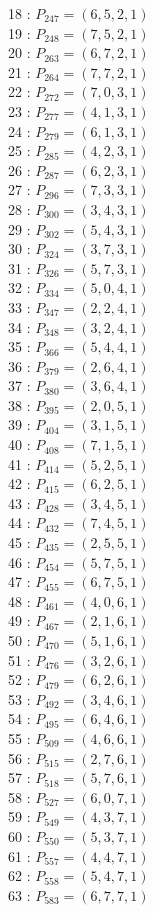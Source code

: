 \documentclass{article}
\begin{document}
{\begin{multicols}{2}
18 : $P_{247}=( 6, 5, 2, 1 )$\\
19 : $P_{248}=( 7, 5, 2, 1 )$\\
20 : $P_{263}=( 6, 7, 2, 1 )$\\
21 : $P_{264}=( 7, 7, 2, 1 )$\\
22 : $P_{272}=( 7, 0, 3, 1 )$\\
23 : $P_{277}=( 4, 1, 3, 1 )$\\
24 : $P_{279}=( 6, 1, 3, 1 )$\\
25 : $P_{285}=( 4, 2, 3, 1 )$\\
26 : $P_{287}=( 6, 2, 3, 1 )$\\
27 : $P_{296}=( 7, 3, 3, 1 )$\\
28 : $P_{300}=( 3, 4, 3, 1 )$\\
29 : $P_{302}=( 5, 4, 3, 1 )$\\
30 : $P_{324}=( 3, 7, 3, 1 )$\\
31 : $P_{326}=( 5, 7, 3, 1 )$\\
32 : $P_{334}=( 5, 0, 4, 1 )$\\
33 : $P_{347}=( 2, 2, 4, 1 )$\\
34 : $P_{348}=( 3, 2, 4, 1 )$\\
35 : $P_{366}=( 5, 4, 4, 1 )$\\
36 : $P_{379}=( 2, 6, 4, 1 )$\\
37 : $P_{380}=( 3, 6, 4, 1 )$\\
38 : $P_{395}=( 2, 0, 5, 1 )$\\
39 : $P_{404}=( 3, 1, 5, 1 )$\\
40 : $P_{408}=( 7, 1, 5, 1 )$\\
41 : $P_{414}=( 5, 2, 5, 1 )$\\
42 : $P_{415}=( 6, 2, 5, 1 )$\\
43 : $P_{428}=( 3, 4, 5, 1 )$\\
44 : $P_{432}=( 7, 4, 5, 1 )$\\
45 : $P_{435}=( 2, 5, 5, 1 )$\\
46 : $P_{454}=( 5, 7, 5, 1 )$\\
47 : $P_{455}=( 6, 7, 5, 1 )$\\
48 : $P_{461}=( 4, 0, 6, 1 )$\\
49 : $P_{467}=( 2, 1, 6, 1 )$\\
50 : $P_{470}=( 5, 1, 6, 1 )$\\
51 : $P_{476}=( 3, 2, 6, 1 )$\\
52 : $P_{479}=( 6, 2, 6, 1 )$\\
53 : $P_{492}=( 3, 4, 6, 1 )$\\
54 : $P_{495}=( 6, 4, 6, 1 )$\\
55 : $P_{509}=( 4, 6, 6, 1 )$\\
56 : $P_{515}=( 2, 7, 6, 1 )$\\
57 : $P_{518}=( 5, 7, 6, 1 )$\\
58 : $P_{527}=( 6, 0, 7, 1 )$\\
59 : $P_{549}=( 4, 3, 7, 1 )$\\
60 : $P_{550}=( 5, 3, 7, 1 )$\\
61 : $P_{557}=( 4, 4, 7, 1 )$\\
62 : $P_{558}=( 5, 4, 7, 1 )$\\
63 : $P_{583}=( 6, 7, 7, 1 )$\\
\end{multicols}
}
\end{document}

